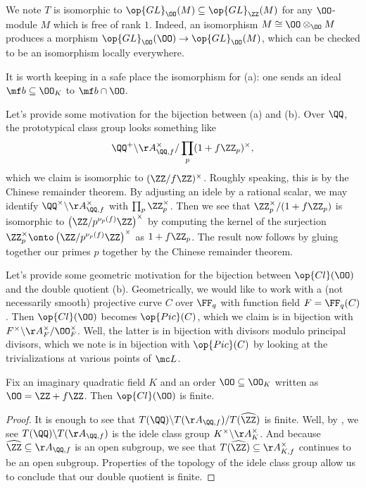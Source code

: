 \documentclass[../notes.tex]{subfiles}
\begin{document}
\begin{remark}
	We note $T$ is isomorphic to $\op{GL}_\OO(M)\subseteq\op{GL}_\ZZ(M)$ for any $\OO$-module $M$ which is free of rank $1$. Indeed, an isomorphism $M\cong\OO\otimes_\OO M$ produces a morphism $\op{GL}_\OO(\OO)\to\op{GL}_\OO(M)$, which can be checked to be an isomorphism locally everywhere.
\end{remark}
\begin{remark}
	It is worth keeping in a safe place the isomorphism for (a): one sends an ideal $\mf b\subseteq\OO_K$ to $\mf b\cap\OO$.
\end{remark}
\begin{remark} \label{rem:idele-double-quotient-example}
	Let's provide some motivation for the bijection between (a) and (b). Over $\QQ$, the prototypical class group looks something like
	\[\QQ^+\backslash\AA_{\QQ,f}^\times/\prod_p(1+f\ZZ_p)^\times,\]
	which we claim is isomorphic to $(\ZZ/f\ZZ)^\times$. Roughly speaking, this is by the Chinese remainder theorem. By adjusting an idele by a rational scalar, we may identify $\QQ^\times\backslash\AA_{\QQ,f}^\times$ with $\prod_p\ZZ_p^\times$. Then we see that $\ZZ_p^\times/(1+f\ZZ_p)$ is isomorphic to $\left(\ZZ/p^{\nu_p(f)}\ZZ\right)^\times$ by computing the kernel of the surjection $\ZZ_p^\times\onto\left(\ZZ/p^{\nu_p(f)}\ZZ\right)^\times$ as $1+f\ZZ_p$. The result now follows by gluing together our primes $p$ together by the Chinese remainder theorem.
\end{remark}
\begin{remark} \label{rem:class-group-as-double-quotient}
	Let's provide some geometric motivation for the bijection between $\op{Cl}(\OO)$ and the double quotient (b). Geometrically, we would like to work with a (not necessarily smooth) projective curve $C$ over $\FF_q$ with function field $F=\FF_q(C)$. Then $\op{Cl}(\OO)$ becomes $\op{Pic}(C)$, which we claim is in bijection with $F^\times\backslash\AA_F^\times/\OO_F^\times$. Well, the latter is in bijection with divisors modulo principal divisors, which we note is in bijection with $\op{Pic}(C)$ by looking at the trivializations at various points of $\mc L$.
\end{remark}
\begin{corollary}
	Fix an imaginary quadratic field $K$ and an order $\OO\subseteq\OO_K$ written as $\OO=\ZZ+f\ZZ$. Then $\op{Cl}(\OO)$ is finite.
\end{corollary}
\begin{proof}
	It is enough to see that $T(\QQ)\backslash T(\AA_{\QQ,f})/T(\widehat\ZZ)$ is finite. Well, by , we see $T(\QQ)\backslash T(\AA_{\QQ,f})$ is the idele class group $K^\times\backslash\AA_K^\times$. And because $\widehat\ZZ\subseteq\AA_{\QQ,f}$ is an open subgroup, we see that $T(\widehat\ZZ)\subseteq\AA_{K,f}^\times$ continues to be an open subgroup. Properties of the topology of the idele class group allow us to conclude that our double quotient is finite.
\end{proof}
\end{document}
